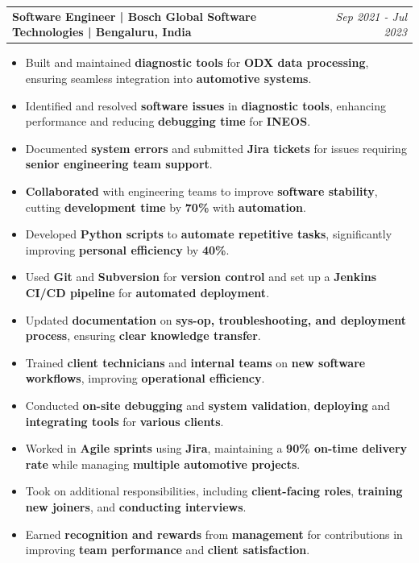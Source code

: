 \documentclass[a4paper,11pt]{article}
\makeatletter
\newcommand{\resumeExp}[2]{
\vspace{0mm}\item[]
    \begin{tabular*}{\textwidth}[t]{l@{\extracolsep{\fill}}r}
        \hspace{-4.4mm} \small\textbf{#1} & {\footnotesize{#2}} \vspace{-1.2mm} %
    \end{tabular*}
    \vspace*{-7mm}
}
\newcommand{\resumeItemListStart}{\begin{justify}\begin{itemize}[leftmargin=1.5ex, rightmargin=2ex, noitemsep,labelsep=1.2mm,itemsep=1mm]\small}
\newcommand{\resumeItemListEnd}{\end{itemize}\end{justify}}%
\makeatother
\begin{document}
\resumeExp
{Software Engineer\textnormal{ | Bosch Global Software Technologies | Bengaluru, India}}
{\textit{Sep 2021 - Jul 2023}}
\resumeItemListStart
\item[$\bullet$] Built and maintained \textbf{diagnostic tools} for \textbf{ODX data processing}, ensuring seamless integration into \textbf{automotive systems}.
\item[$\bullet$] Identified and resolved \textbf{software issues} in \textbf{diagnostic tools}, enhancing performance and reducing \textbf{debugging time} for \textbf{INEOS}.
\item[$\bullet$] Documented \textbf{system errors} and submitted \textbf{Jira tickets} for issues requiring \textbf{senior engineering team support}.
\item[$\bullet$] \textbf{Collaborated} with engineering teams to improve \textbf{software stability}, cutting \textbf{development time} by \textbf{70\%} with \textbf{automation}.
\item[$\bullet$] Developed \textbf{Python scripts} to \textbf{automate repetitive tasks}, significantly improving \textbf{personal efficiency} by \textbf{40\%}.
\item[$\bullet$] Used \textbf{Git} and \textbf{Subversion} for \textbf{version control} and set up a \textbf{Jenkins CI/CD pipeline} for \textbf{automated deployment}.
\item[$\bullet$] Updated \textbf{documentation} on \textbf{sys-op, troubleshooting, and deployment process}, ensuring \textbf{clear knowledge transfer}.
\item[$\bullet$] Trained \textbf{client technicians} and \textbf{internal teams} on \textbf{new software workflows}, improving \textbf{operational efficiency}.
\item[$\bullet$] Conducted \textbf{on-site debugging} and \textbf{system validation}, \textbf{deploying} and \textbf{integrating tools} for \textbf{various clients}.
\item[$\bullet$] Worked in \textbf{Agile sprints} using \textbf{Jira}, maintaining a \textbf{90\% on-time delivery rate} while managing \textbf{multiple automotive projects}.
\item[$\bullet$] Took on additional responsibilities, including \textbf{client-facing roles}, \textbf{training new joiners}, and \textbf{conducting interviews}.
\item[$\bullet$] Earned \textbf{recognition and rewards} from \textbf{management} for contributions in improving \textbf{team performance} and \textbf{client satisfaction}.
\resumeItemListEnd
\end{document}
